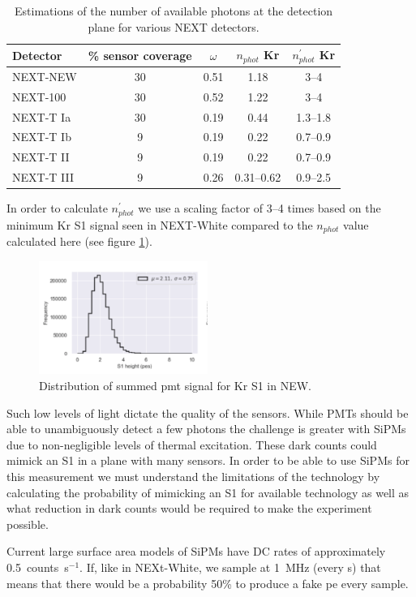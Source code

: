 \documentclass[11pt,a4paper]{article}
\begin{document}
\begin{table}
  \begin{center}
    \begin{tabular}{|l|c|c|c|c|}
      \hline
      Detector & \% sensor coverage & $\omega$ & $n_{phot}$ Kr & $n_{phot}^{\prime}$ Kr \\
      \hline
      NEXT-NEW & 30 & 0.51 &            1.18 &    3--4  \\
      NEXT-100  & 30 & 0.52 &            1.22 &    3--4   \\
      NEXT-T Ia  & 30 & 0.19 &            0.44 & 1.3--1.8 \\
      NEXT-T Ib  &   9 & 0.19 &            0.22 & 0.7--0.9 \\
      NEXT-T II   &   9 & 0.19 &            0.22 & 0.7--0.9 \\
      NEXT-T III  &   9 & 0.26 & 0.31--0.62 & 0.9--2.5 \\
      \hline
    \end{tabular}
  \end{center}
  \caption{\label{tab:s1phot} Estimations of the number of available photons at the detection plane for various NEXT detectors.}
\end{table}
In order to calculate $n_{phot}^{\prime}$ we use a scaling factor of 3--4 times based on the minimum Kr S1 signal seen in NEXT-White compared to the $n_{phot}$ value calculated here (see figure \ref{fig:news1}).
\begin{figure}
  \begin{center}
    \includegraphics[width=0.49\textwidth]{img/NEW_s1_eng}
  \end{center}
  \caption{\label{fig:news1} Distribution of summed pmt signal for Kr S1 in NEW.}
\end{figure}
Such low levels of light dictate the quality of the sensors. While PMTs should be able to unambiguously detect a few photons the challenge is greater with SiPMs due to non-negligible levels of thermal excitation. These dark counts could mimick an S1 in a plane with many sensors. In order to be able to use SiPMs for this measurement we must understand the limitations of the technology by calculating the probability of mimicking an S1 for available technology as well as what reduction in dark counts would be required to make the experiment possible.

Current large surface area models of SiPMs have DC rates of approximately 0.5~counts~\textmu s$^{-1}$. If, like in NEXt-White, we sample at 1~MHz (every \textmu s) that means that there would be a probability 50\% to produce a fake pe every sample.



\end{document}
